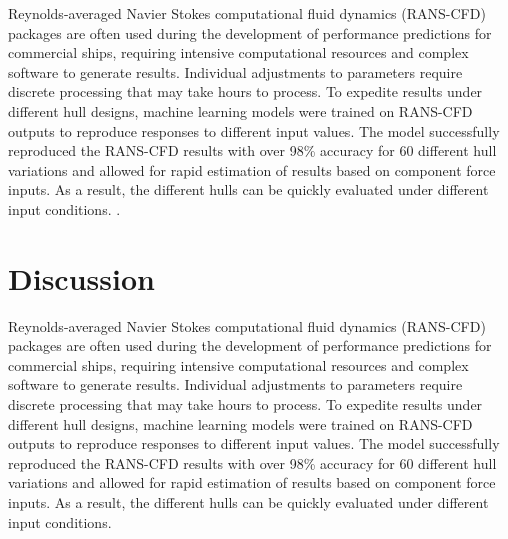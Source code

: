 \documentclass[twoside,twocolumn]{article}
\begin{document}
Reynolds-averaged Navier Stokes computational fluid dynamics (RANS-CFD) packages are often used during the development of performance predictions for commercial ships, requiring intensive computational resources and complex software to generate results. Individual adjustments to parameters require discrete processing that may take hours to process. To expedite results under different hull designs, machine learning models were trained on RANS-CFD outputs to reproduce responses to different input values. The model successfully reproduced the RANS-CFD results with over 98\% accuracy for 60 different hull variations and allowed for rapid estimation of results based on component force inputs. As a result, the different hulls can be quickly evaluated under different input conditions. \citep{Freeman2018}.



\section{Discussion}

Reynolds-averaged Navier Stokes computational fluid dynamics (RANS-CFD) packages are often used during the development of performance predictions for commercial ships, requiring intensive computational resources and complex software to generate results. Individual adjustments to parameters require discrete processing that may take hours to process. To expedite results under different hull designs, machine learning models were trained on RANS-CFD outputs to reproduce responses to different input values. The model successfully reproduced the RANS-CFD results with over 98\% accuracy for 60 different hull variations and allowed for rapid estimation of results based on component force inputs. As a result, the different hulls can be quickly evaluated under different input conditions.



{}


\appendix
\end{document}
